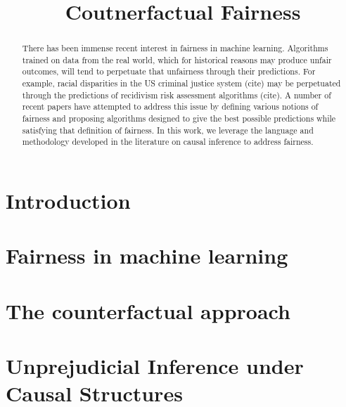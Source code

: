 \documentclass{article}
\title{Coutnerfactual Fairness}
\begin{document}
\maketitle
\begin{abstract}
There has been immense recent interest in fairness in machine learning. Algorithms trained on data from the real world, which for historical reasons may produce unfair outcomes, will tend to perpetuate that unfairness through their predictions. For example, racial disparities in the US criminal justice system (cite) may be perpetuated through the predictions of recidivism risk assessment algorithms (cite). A number of recent papers have attempted to address this issue by defining various notions of fairness and proposing algorithms designed to give the best possible predictions while satisfying that definition of fairness. In this work, we leverage the language and methodology developed in the literature on causal inference to address fairness.
\end{abstract} 


\section{Introduction}


\section{Fairness in machine learning}


\section{The counterfactual approach}



\section{Unprejudicial Inference under Causal Structures}
\label{sec-1}
\end{document}
